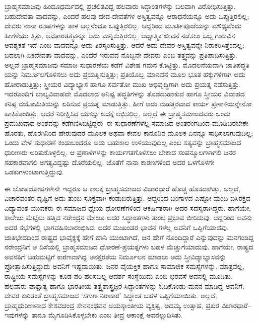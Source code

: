 ಬ್ರಾಹ್ಮಸಮಾಜವು ಹಿಂದೂಧರ್ಮದಲ್ಲಿ ಪ್ರಚಲಿತವಿದ್ದ ಹಲವಾರು ಸಿದ್ಧಾಂತಗಳನ್ನು ಬಲವಾಗಿ ವಿರೋಧಿಸುತ್ತಿತ್ತು. ಬಹುದೇವತಾ ವಾದವನ್ನು, ಎಂದರೆ ಹಲವು ದೇವ-ದೇವತೆಗಳ ಅಸ್ತಿತ್ವವನ್ನೂ ಆರಾಧನೆಯನ್ನೂ ಅದು ಒಪ್ಪುತ್ತಿರಲಿಲ್ಲ; ದೇವರು ನಾನಾ ರೂಪಗಳನ್ನು ತಾಳ ಬಲ್ಲನೆಂದೂ ಒಪ್ಪುತ್ತಿರಲಿಲ್ಲ. ಆದ್ದರಿಂದ ಮೂರ್ತಿಪೂಜೆಯನ್ನು ಮೌಢ್ಯವೆಂದು ಹೀಗಳೆಯು ತ್ತಿತ್ತು. ಅವತಾರತತ್ತ್ವವನ್ನೂ ಅದು ಮನ್ನಿಸುತ್ತಿರಲಿಲ್ಲ. ಆಧ್ಯಾತ್ಮಿಕ ಜೀವನ ನಡೆಸಲು ಒಬ್ಬ ಗುರುವಿನ ಆವಶ್ಯಕತೆ ಇದೆ ಎಂಬ ವಾದವನ್ನೂ ಅದು ತಿರಸ್ಕರಿಸುತ್ತಿತ್ತು. ಆದರೆ ಅದು ದೇವರ ಅಸ್ತಿತ್ವವನ್ನೇ ನಿರಾಕರಿಸಿತ್ತೆಂದಲ್ಲ; ಬದಲಾಗಿ ಏಕದೇವತಾ ವಾದವನ್ನು, ಎಂದರೆ ಇರುವವ ನೊಬ್ಬನೇ ದೇವರು ಎಂಬ ತತ್ತ್ವವನ್ನು ಪ್ರತಿಪಾದಿಸುತ್ತಿತ್ತು. ಅಲ್ಲದೆ ಬ್ರಾಹ್ಮಸಮಾಜವು ಸಮಾಜ ಸುಧಾರಣೆಯ ಕಡೆಗೆ ವಿಶೇಷ ಗಮನ ಕೊಟ್ಟಿತ್ತು. ಮೊದಲನೆಯದಾಗಿ ಜಾತಿಪದ್ಧತಿ ಯನ್ನು ನಿರ್ಮೂಲಗೊಳಿಸಲು ಅದು ಪ್ರಯತ್ನಿಸುತ್ತಿತ್ತು; ಪ್ರತಿಯೊಬ್ಬ ಮಾನವನ ಮೂಲ ಭೂತ ಹಕ್ಕುಗಳಿಗಾಗಿ ಅದು ಹೋರಾಡುತ್ತಿತ್ತು; ಸ್ತ್ರೀಯರ ವಿದ್ಯಾಭ್ಯಾಸ ಹಾಗೂ ಸರ್ವತೋ ಮುಖ ಅಭಿವೃದ್ಧಿಗಾಗಿ ಅದು ಪ್ರಯತ್ನ ನಡೆಸುತ್ತಿತ್ತು. ಇದರೊಂದಿಗೆ ಬಾಲ್ಯವಿವಾಹವೇ ಮೊದಲಾದ ಅನಿಷ್ಟ ಪದ್ಧತಿಗಳನ್ನು ತೊಡೆದುಹಾಕುವ ಹಾಗೂ ಸ್ತ್ರೀಯರ ವಿವಾಹದ ಕನಿಷ್ಠ ವಯೋಮಿತಿಯನ್ನು ಏರಿಸುವ ಪ್ರಯತ್ನ ಮಾಡುತ್ತಿತ್ತು. ಹೀಗೆ ಅದು ಮಹತ್ತರವಾದ ಕಾರ್ಯ ಪ್ರಣಾಳಿಯನ್ನೇನೋ ಹಾಕಿಕೊಂಡಿತ್ತು. ಆದರೆ ನಿರೀಕ್ಷಿಸಿದ ಯಶಸ್ಸು ಅದಕ್ಕೆ ಲಭಿಸಲಿಲ್ಲ. ಅಲ್ಲದೆ ಈ ಬ್ರಾಹ್ಮಸಮಾಜದವರು ಒಂದು ಪ್ರಮುಖವಾದ ಅಂಶವನ್ನು ಕಡೆಗಣಿಸಿಬಿಟ್ಟಿದ್ದರು–ಈ ಸುಧಾರಣೆಗಳೆಲ್ಲ ಸಮಾಜದ ಅಂತರಂಗದಿಂದ ಮೂಡಿಬರಬೇಕೇ ಹೊರತು, ಹೊರಗಿನಿಂದ ಹೇರುವುದರ ಮೂಲಕ ಅಥವಾ ಕೇವಲ ಕಾನೂನಿನ ಮೂಲಕ ಏನನ್ನೂ ಸಾಧಿಸಲಾಗುವುದಿಲ್ಲ; ಒಂದು ವೇಳೆ ಸುಧಾರಣೆ ಕಂಡುಬಂದರೂ ಅದು ಬಹುಕಾಲ ಉಳಿಯುವುದಿಲ್ಲ ಎಂಬ ಸತ್ಯವನ್ನು ಬ್ರಾಹ್ಮಸಮಾಜದ ಧುರೀಣರು ಅರಿತುಕೊಳ್ಳಲಿಲ್ಲ. ಆ ಪ್ರಣಾಳಿಗಳನ್ನು ಕಾರ್ಯಗತಗೊಳಿಸಲು ಬೇಕಾದ ಸಂಪನ್ಮೂಲಗಳಾಗಲಿ ಜನರ ಸಹಕಾರವಾಗಲಿ ಅಗತ್ಯವಿದ್ದಷ್ಟು ದೊರೆಯಲಿಲ್ಲ. ಜೊತೆಗೆ ನಾನಾ ಕಾರಣಗಳಿಂದ ಅದರ ಒಳಗೊಳಗೇ ಒಡಕುಗಳುಂಟಾಗುತ್ತಿದ್ದುವು.

ಈ ಲೋಪದೋಷಗಳೇನೇ ಇದ್ದರೂ ಆ ಕಾಲಕ್ಕೆ ಬ್ರಾಹ್ಮಸಮಾಜದ ವಿಚಾರಧಾರೆ ಹೊಚ್ಚ ಹೊಸದಾಗಿತ್ತು. ಅಲ್ಲದೆ, ವಿಚಾರವಂತರ ದೃಷ್ಟಿಗೆ ಅದು ತುಂಬ ಸೂಕ್ತವಾಗಿ ಕಂಡುಬರುತ್ತಿತ್ತು. ಆದ್ದರಿಂದ ಬಂಗಾಳದ ಎಷ್ಟೋ ಮಂದಿ ಬಿಸಿರಕ್ತದ ವಿದ್ಯಾವಂತ ಯುವಕರು ಈ ಸಮಾಜದ ಧ್ಯೇಯ ಧೋರಣೆಗಳಿಂದ ಆಕರ್ಷಿತರಾಗಿ ಅದರ ಸದಸ್ಯರಾಗಿದ್ದರು. ಹಾಗೆಯೇ, ಕಾಲೇಜು ಮೆಟ್ಟಿಲು ಹತ್ತಿದ ನರೇಂದ್ರನ ಮೇಲೂ ಅದರ ಸಿದ್ಧಾಂತಗಳು ತುಂಬ ಪ್ರಭಾವ ಬೀರಿದುವು. ಆದ್ದರಿಂದ ಅವನು ಅದರ ಸಭೆಗಳಲ್ಲಿ ಭಾಗವಹಿಸಲಾರಂಭಿಸಿದ. ಅದರ ಮುಖಂಡರ ಭಾವನೆ ಗಳೆಲ್ಲ ಅವನಿಗೆ ಒಪ್ಪಿಗೆಯಾದವು. ಜಾತಿಭೇದದಿಂದ ರಾಷ್ಟ್ರದ ಭಾವೈಕ್ಯಕ್ಕೆ ಹೇಗೆ ಹಾನಿ ಯುಂಟಾಗಿದೆ, ಜನ ಹೇಗೆ ನೊಂದಿದ್ದಾರೆ ಎನ್ನುವುದನ್ನು ಮನಗಂಡಿದ್ದ ನರೇಂದ್ರನಿಗೆ ಆ ದಿಸೆಯಲ್ಲಿ ಬ್ರಾಹ್ಮಸಮಾಜದ ಧೋರಣೆ-ಪ್ರಯತ್ನಗಳು ಬಹಳ ಮೆಚ್ಚುಗೆಯಾದುವು. ಹಾಗೆಯೇ, ರಾಷ್ಟ್ರದ ಅವನತಿಗೆ ಬಹುಮಟ್ಟಿಗೆ ಕಾರಣವಾಗಿದ್ದ ಅನಕ್ಷರತೆಯ ನಿರ್ಮೂಲನ ಮಾಡಲು ಅದು ಸ್ತ್ರೀವಿದ್ಯಾಭ್ಯಾಸವನ್ನು ಪ್ರೋತ್ಸಾಹಿಸುತ್ತಿದ್ದುದು ಅವನಿಗೆ ಇಷ್ಟವಾಯಿತು. ಜನರ ವೈಯಕ್ತಿಕ ಹಾಗೂ ಸಾಮಾಜಿಕ ಸಮಸ್ಯೆಗಳನ್ನು, ಮಾತ್ರವಲ್ಲ, ರಾಷ್ಟ್ರೀಯ ಸಮಸ್ಯೆಗಳನ್ನು ಕೂಡ ಪರಿ ಹರಿಸಬಲ್ಲ ಆದರ್ಶ ಸಂಸ್ಥೆಯಿದು ಎಂಬ ಭರವಸೆ ಅವನಲ್ಲಿ ಮೂಡಿತು. ಹಲವಾರು ಪಾಶ್ಚಾತ್ಯ ಹಾಗೂ ಭಾರತೀಯ ತತ್ತ್ವಶಾಸ್ತ್ರಜ್ಞರ ಸಿದ್ಧಾಂತಗಳನ್ನು ಓದಿಕೊಂಡು ಮನನ ಮಾಡಿದ್ದ ಅವನಿಗೆ, ದೇವರ ಕುರಿತಂತೆ ಬ್ರಾಹ್ಮಸಮಾಜದ ‘ಸಗುಣ ನಿರಾಕಾರ’ ಸಿದ್ಧಾಂತ ಬಹಳ ಒಪ್ಪಿಗೆಯಾಯಿತು. ಅಲ್ಲದೆ, ಬ್ರಾಹ್ಮಧುರೀಣನಾದ ಕೇಶವಚಂದ್ರ ಸೇನನಂಥವನ ಅಯಸ್ಕಾಂತೀಯ ವ್ಯಕ್ತಿತ್ವ, ಅದಮ್ಯ ಉತ್ಸಾಹ, ಪ್ರಖರ ವಿಚಾರಧಾರೆ–ಇವುಗಳನ್ನು ತಾನೂ ಮೈಗೂಡಿಸಿಕೊಳ್ಳಬೇಕು ಎಂಬ ತೀವ್ರ ಆಕಾಂಕ್ಷೆ ಅವನಲ್ಲುದಿಸಿತು.

